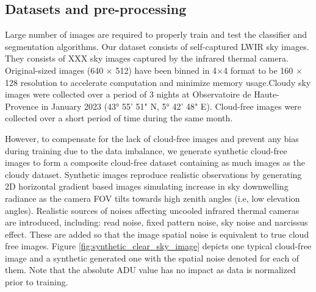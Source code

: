 \documentclass[amt, article]{copernicus}
\begin{document}

\subsection{Datasets and pre-processing}

Large number of images are required to properly train and test the classifier and segmentation algorithms. Our dataset consists of self-captured LWIR sky images. They consists of XXX sky images captured by the infrared thermal camera. Original-sized images (640 $\times$ 512) have been binned in 4$\times$4 format to be 160 $\times$ 128 resolution to accelerate computation and minimize memory usage.Cloudy sky images were collected over a period of 3 nights at Observatoire de Haute-Provence in January 2023 (43° 55' 51" N, 5° 42' 48" E). Cloud-free images were collected over a short period of time during the same month.

However, to compensate for the lack of cloud-free images and prevent any bias during training due to the data imbalance, we generate synthetic cloud-free images to form a composite cloud-free dataset containing as much images as the cloudy dataset. Synthetic images reproduce realistic observations by generating 2D horizontal gradient based images simulating increase in sky downwelling radiance as the camera FOV tilts towards high zenith angles (i.e, low elevation angles). Realistic sources of noises affecting uncooled infrared thermal cameras are introduced, including: read noise, fixed pattern noise, sky noise and narcissus effect. These are added so that the image spatial noise is equivalent to true cloud free images. Figure \ref{fig:synthetic_clear_sky_image} depicts one typical cloud-free image and a synthetic generated one with the spatial noise denoted for each of them. Note that the absolute ADU value has no impact as data is normalized prior to training.
\end{document}
